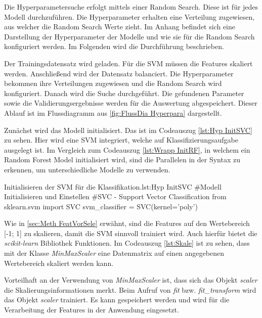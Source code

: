 Die Hyperparametersuche erfolgt mittels einer Random Search. Diese ist für jedes Modell durchzuführen. Die Hyperparameter erhalten eine Verteilung zugewiesen, aus welcher die Random Search Werte zieht. Im Anhang befindet sich eine Darstellung der Hyperparameter der Modelle und wie sie für die Random Search konfiguriert werden. Im Folgenden wird die Durchführung beschrieben.  \par

Der Trainingsdatensatz wird geladen. Für die SVM müssen die Features skaliert werden. Anschließend wird der Datensatz balanciert. Die Hyperparameter bekommen ihre Verteilungen zugewiesen und die Random Search wird konfiguriert. Danach wird die Suche durchgeführt. Die gefundenen Parameter sowie die Validierungsergebnisse werden für die Auswertung abgespeichert. Dieser Ablauf ist im Flussdiagramm aus \autoref{fig:FlussDia Hyperpara} dargestellt.\par


Zunächst wird das Modell initialisiert. Das ist im Codeauszug \ref{lst:Hyp InitSVC} zu sehen. Hier wird eine SVM integriert, welche auf Klassifizierungsaufgabe ausgelegt ist. Im Vergleich zum Codeauszug \ref{lst:Wrapp InitRF}, in welchem ein Random Forest Model initialisiert wird, sind die Parallelen in der Syntax zu erkennen, um unterschiedliche Modelle zu verwenden. 

\begin{pythoncode}{Initialisieren der SVM für die Klassifikation.}{lst:Hyp InitSVC}
#Modell Initialisieren und Einstellen
#SVC - Support Vector Classification
from sklearn.svm import SVC
svm_classifier = SVC(kernel='poly')
\end{pythoncode}

Wie in \autoref{sec:Meth FeatVorSele} erwähnt, sind die Features auf den Wertebereich [-1; 1] zu skalieren, damit die SVM sinnvoll trainiert wird. Auch hierfür bietet die \textit{scikit-learn} Bibliothek Funktionen. Im Codeauszug \ref{lst:Skale} ist zu sehen, dass mit der Klasse \textit{MinMaxScaler} eine Datenmatrix auf einen angegebenen Wertebereich skaliert werden kann.\par

Vorteilhaft an der Verwendung von \textit{MinMaxScaler} ist, dass sich das Objekt \textit{scaler} die Skalierungsinformationen merkt. Beim Aufruf von \textit{fit} bzw. \textit{fit\_transform} wird das Objekt \textit{scaler} trainiert. Es kann gespeichert werden und wird für die Verarbeitung der Features in der Anwendung eingesetzt. 


